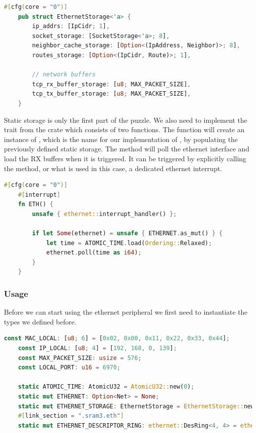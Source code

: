 \begin{lstlisting}[language=Rust,frame=single,float=!ht,style=customrust,label={lst:static-net-storage},caption={Definition of Net Static Storage Type}]
    #[cfg(core = "0")]
    pub struct EthernetStorage<'a> {
        ip_addrs: [IpCidr; 1],
        socket_storage: [SocketStorage<'a>; 8],
        neighbor_cache_storage: [Option<(IpAddress, Neighbor)>; 8],
        routes_storage: [Option<(IpCidr, Route)>; 1],

        // network buffers
        tcp_rx_buffer_storage: [u8; MAX_PACKET_SIZE],
        tcp_tx_buffer_storage: [u8; MAX_PACKET_SIZE],
    }
\end{lstlisting}

Static storage is only the first part of the puzzle. We also need to implement the  trait from the  crate which consists of two functions. The  function will create an instance of , which is the name for our implementation of , by populating the previously defined static storage. The  method will poll the ethernet interface and load the RX buffers when it is triggered. It can be triggered by explicitly calling the method, or what is used in this case, a dedicated ethernet interrupt.

\begin{lstlisting}[language=Rust,frame=single,float=!ht,style=customrust,label={lst:eth-interrup-handler},caption={Ethernet Interrupt Handler}]
    #[cfg(core = "0")]
    #[interrupt]
    fn ETH() {
        unsafe { ethernet::interrupt_handler() };

        if let Some(ethernet) = unsafe { ETHERNET.as_mut() } {
            let time = ATOMIC_TIME.load(Ordering::Relaxed);
            ethernet.poll(time as i64);
        }
    }
\end{lstlisting}

\subsubsection{Usage}

Before we can start using the ethernet peripheral we first need to instantiate the types we defined before.

\begin{lstlisting}[language=Rust,frame=single,float=!ht,style=customrust,label={lst:eth-globals},caption={Global Static Variables Related to Ethernet}]
    const MAC_LOCAL: [u8; 6] = [0x02, 0x00, 0x11, 0x22, 0x33, 0x44];
    const IP_LOCAL: [u8; 4] = [192, 168, 0, 139];
    const MAX_PACKET_SIZE: usize = 576;
    const LOCAL_PORT: u16 = 6970;

    static ATOMIC_TIME: AtomicU32 = AtomicU32::new(0);
    static mut ETHERNET: Option<Net> = None;
    static mut ETHERNET_STORAGE: EthernetStorage = EthernetStorage::new();
    #[link_section = ".sram3.eth"]
    static mut ETHERNET_DESCRIPTOR_RING: ethernet::DesRing<4, 4> = ethernet::DesRing::new();
\end{lstlisting}

